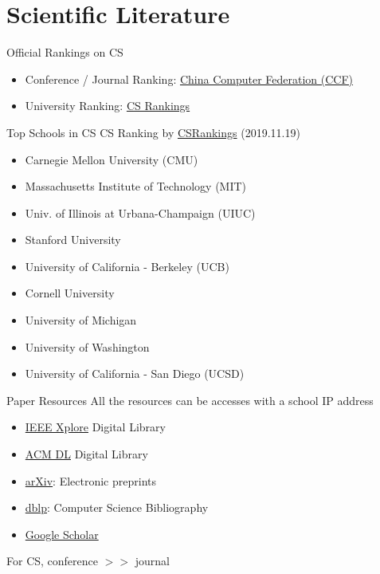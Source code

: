 \documentclass{../TexTemplate/myslide}
\begin{document}
\section{Scientific Literature}
\begin{frame}
\sectionpage
\end{frame}

\begin{frame}{Official Rankings on CS}
\begin{itemize}
	\item Conference / Journal Ranking: \href{https://www.ccf.org.cn/xspj/gyml/}{China Computer Federation (CCF)}
	\item University Ranking: \href{http://csrankings.org/\#/index?all}{CS Rankings}
\end{itemize}
\end{frame}

\begin{frame}{Top Schools in CS}
CS Ranking by \href{http://csrankings.org/\#/index?all}{CSRankings} (2019.11.19)
\begin{itemize}
	\item Carnegie Mellon University (CMU)
	\item Massachusetts Institute of Technology (MIT)
	\item Univ. of Illinois at Urbana-Champaign (UIUC)
	\item Stanford University
	\item University of California - Berkeley (UCB)
	\item Cornell University
	\item University of Michigan
	\item University of Washington
	\item University of California - San Diego (UCSD)
\end{itemize}
\end{frame}

\begin{frame}{Paper Resources}
All the resources can be accesses with a school IP address
\begin{itemize}
	\item \href{https://ieeexplore.ieee.org/Xplore/home.jsp}{IEEE Xplore} Digital Library
	\item \href{https://dl.acm.org/}{ACM DL} Digital Library
	\item \href{https://arxiv.org/}{arXiv}: Electronic preprints
	\item \href{https://dblp.org/}{dblp}: Computer Science Bibliography
	\item \href{https://scholar.google.com/}{Google Scholar}
\end{itemize}
For CS, conference $>>$ journal
\end{frame}
\end{document}
